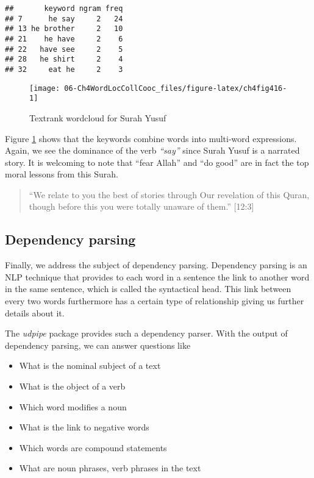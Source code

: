 \documentclass[
]{article}
\providecommand{\tightlist}{%
  \setlength{\itemsep}{0pt}\setlength{\parskip}{0pt}}
\begin{document}
\begin{verbatim}
##       keyword ngram freq
## 7      he say     2   24
## 13 he brother     2   10
## 21    he have     2    6
## 22   have see     2    5
## 28   he shirt     2    4
## 32     eat he     2    3
\end{verbatim}

\normalsize

\begin{figure}

{\centering \texttt{[image: 06-Ch4WordLocCollCooc\_files/figure-latex/ch4fig416-1]} 

}

\caption{Textrank wordcloud for Surah Yusuf}\label{fig:ch4fig416}
\end{figure}

Figure \ref{fig:ch4fig416} shows that the keywords combine words into multi-word expressions. Again, we see the dominance of the verb \emph{``say''} since Surah Yusuf is a narrated story. It is welcoming to note that ``fear Allah'' and ``do good'' are in fact the top moral lessons from this Surah.

\begin{quote}
``We relate to you the best of stories through Our revelation of this Quran, though before this you were totally unaware of them.'' {[}12:3{]}
\end{quote}

\hypertarget{dependency-parsing}{%
\subsection{Dependency parsing}\label{dependency-parsing}}

Finally, we address the subject of dependency parsing. Dependency parsing is an NLP technique that provides to each word in a sentence the link to another word in the same sentence, which is called the syntactical head. This link between every two words furthermore has a certain type of relationship giving us further details about it.

The \emph{udpipe} package provides such a dependency parser. With the output of dependency parsing, we can answer questions like

\begin{itemize}
\tightlist
\item
  What is the nominal subject of a text
\item
  What is the object of a verb
\item
  Which word modifies a noun
\item
  What is the link to negative words
\item
  Which words are compound statements
\item
  What are noun phrases, verb phrases in the text
\end{itemize}
\end{document}
